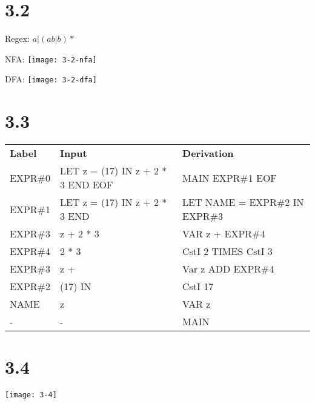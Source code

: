 \documentclass{article}
\begin{document}
\section*{3.2}

Regex: $a|(ab|b)*$

NFA: \texttt{[image: 3-2-nfa]}

DFA: \texttt{[image: 3-2-dfa]}

\section*{3.3}

\begin{tabular}{l l l}
\textbf{Label} & \textbf{Input} & \textbf{Derivation} \\
EXPR\#0 & LET z = (17) IN z + 2 * 3 END EOF & MAIN EXPR\#1 EOF \\
EXPR\#1 & LET z = (17) IN z + 2 * 3 END & LET NAME = EXPR\#2 IN EXPR\#3 \\
EXPR\#3 & z + 2 * 3 & VAR z + EXPR\#4 \\
EXPR\#4 & 2 * 3 & CstI 2 TIMES CstI 3 \\
EXPR\#3 & z + & Var z ADD EXPR\#4 \\
EXPR\#2 & (17) IN & CstI 17 \\
NAME    & z & VAR z \\
-       & - & MAIN

\end{tabular}

\section*{3.4}

\texttt{[image: 3-4]}
\end{document}
